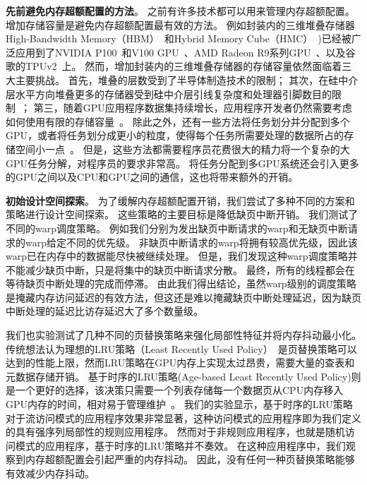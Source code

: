 \textbf{先前避免内存超额配置的方法}。
之前有许多技术都可以用来管理内存超额配置。
增加存储容量是避免内存超额配置最有效的方法。
例如封装内的三维堆叠存储器High-Bandwidth Memory（HBM）~和Hybrid Memory Cube（HMC）~)已经被广泛应用到了NVIDIA P100~和V100 GPU~、AMD Radeon R9系列GPU~、以及谷歌的TPUv2~上。
然而，增加封装内的三维堆叠存储器的存储容量依然面临着三大主要挑战。
首先，堆叠的层数受到了半导体制造技术的限制；
其次，在硅中介层水平方向堆叠更多的存储器受到硅中介层引线复杂度和处理器引脚数目的限制~；
第三，随着GPU应用程序数据集持续增长，应用程序开发者仍然需要考虑如何使用有限的存储容量~。
除此之外，还有一些方法将任务划分并分配到多个GPU，或者将任务划分成更小的粒度，使得每个任务所需要处理的数据所占的存储空间小一点~。
但是，这些方法都需要程序员花费很大的精力将一个复杂的大GPU任务分解，对程序员的要求非常高。
将任务分配到多GPU系统还会引入更多的GPU之间以及CPU和GPU之间的通信，这也将带来额外的开销。

\textbf{初始设计空间探索}。
为了缓解内存超额配置开销，我们尝试了多种不同的方案和策略进行设计空间探索。
这些策略的主要目标是降低缺页中断开销。
我们测试了不同的warp调度策略。
例如我们分别为发出缺页中断请求的warp和无缺页中断请求的warp给定不同的优先级。
非缺页中断请求的warp将拥有较高优先级，因此该warp已在内存中的数据能尽快被继续处理。
但是，我们发现这种warp调度策略并不能减少缺页中断，只是将集中的缺页中断请求分散。
最终，所有的线程都会在等待缺页中断处理的完成而停滞。
由此我们得出结论，虽然warp级别的调度策略是掩藏内存访问延迟的有效方法，但这还是难以掩藏缺页中断处理延迟，因为缺页中断处理的延迟比访存延迟大了多个数量级。

我们也实验测试了几种不同的页替换策略来强化局部性特征并将内存抖动最小化。
传统想法认为理想的LRU策略（Least Recently Used Policy）~是页替换策略可以达到的性能上限，然而LRU策略在GPU内存上实现太过昂贵，需要大量的查表和元数据存储开销。
基于时序的LRU策略(Age-based Least Recently Used Policy)则是一个更好的选择，该决策只需要一个列表存储每一个数据页从CPU内存移入GPU内存的时间，相对易于管理维护~。
我们的实验显示，基于时序的LRU策略对于流访问模式的应用程序效果非常显著，这种访问模式的应用程序即为我们定义的具有强序列局部性的规则应用程序。
然而对于非规则应用程序，也就是随机访问模式的应用程序，基于时序的LRU策略并不奏效。
在这种应用程序中，我们观察到内存超额配置会引起严重的内存抖动。
因此，没有任何一种页替换策略能够有效减少内存抖动。

